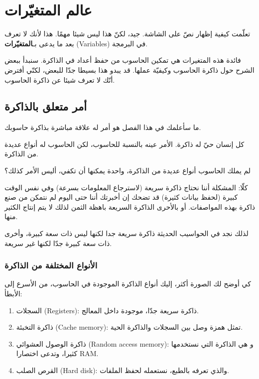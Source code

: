 \chapter{عالم المتغيّرات}

تعلّمت كيفية إظهار نصّ على الشاشة. جيد، لكنّ هذا ليس شيئا مهمًا. هذا لأنك لا تعرف بعد ما يدعى بـ\textbf{المتغيّرات}
(\textenglish{Variables})
في البرمجة.

فائدة هذه المتغيرات هي تمكين الحاسوب من حفظ أعداد في الذاكرة. سنبدأ ببعض الشرح حول ذاكرة الحاسوب وكيفيّة عملها. قد يبدو هذا بسيطا جدّا للبعض، لكنّي أفترض أنّك لا تعرف شيئا عن ذاكرة الحاسوب.

\section{أمر متعلق بالذاكرة}
ما سأعلمك في هذا الفصل هو أمر له علاقة مباشرة بذاكرة حاسوبك.

كل إنسان حيّ له ذاكرة. الأمر عينه بالنسبة للحاسوب، لكن الحاسوب له أنواع عديدة من الذاكرة.

\begin{question}
  لم يملك الحاسوب أنواع عديدة من الذاكرة، واحدة يمكنها أن تكفي، أليس الأمر كذلك؟
\end{question}

كلّا: المشكلة أننا نحتاج ذاكرة سريعة (لاسترجاع المعلومات بسرعة) وفي نفس الوقت كبيرة (لحفظ بيانات كثيرة) قد تضحك إن أخبرتك أننا حتى اليوم لم نتمكن من صنع ذاكرة بهذه المواصفات. أو بالأحرى الذاكرة السريعة باهظة الثمن لذلك لا يتم إنتاج الكثير منها.

لذلك نجد في الحواسيب الحديثة ذاكرة سريعة جدا لكنها ليس ذات سعة كبيرة، وأخرى ذات سعة كبيرة جدّا لكنها غير سريعة.

\subsection{الأنواع المختلفة من الذاكرة}
كي أوضح لك الصورة أكثر، إليك أنواع الذاكرة الموجودة في الحاسوب، من الأسرع إلى الأبطأ:

\begin{enumerate}
  \item السجلات
  (\textenglish{Registers}):
ذاكرة سريعة جدّا، موجودة داخل المعالج.
  \item ذاكرة التخبئة 
  (\textenglish{Cache memory}):
تمثل همزة وصل بين السجلات والذاكرة الحية.
  \item ذاكرة الوصول العشوائي 
  (\textenglish{Random access memory}):
و هي الذاكرة التي نستخدمها كثيرا، وتدعى اختصارا
\textenglish{RAM}.
  \item القرص الصلب
  (\textenglish{Hard disk}):
والذي تعرفه بالطبع، نستعمله لحفظ الملفات.
\end{enumerate}

